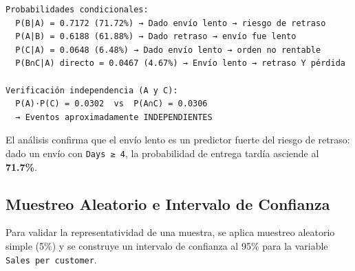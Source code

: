 \documentclass[
  letterpaper,
  DIV=11,
  numbers=noendperiod]{scrartcl}
\begin{document}
\begin{verbatim}
Probabilidades condicionales:
  P(B|A) = 0.7172 (71.72%) → Dado envío lento → riesgo de retraso
  P(A|B) = 0.6188 (61.88%) → Dado retraso → envío fue lento
  P(C|A) = 0.0648 (6.48%) → Dado envío lento → orden no rentable
  P(B∩C|A) directo = 0.0467 (4.67%) → Envío lento → retraso Y pérdida

Verificación independencia (A y C):
  P(A)·P(C) = 0.0302  vs  P(A∩C) = 0.0306
  → Eventos aproximadamente INDEPENDIENTES
\end{verbatim}

El análisis confirma que el envío lento es un predictor fuerte del
riesgo de retraso: dado un envío con \texttt{Days\ ≥\ 4}, la
probabilidad de entrega tardía asciende al \textbf{71.7\%}.

\subsection{Muestreo Aleatorio e Intervalo de
Confianza}\label{muestreo-aleatorio-e-intervalo-de-confianza}

Para validar la representatividad de una muestra, se aplica muestreo
aleatorio simple (5\%) y se construye un intervalo de confianza al 95\%
para la variable \texttt{Sales\ per\ customer}.
\end{document}
